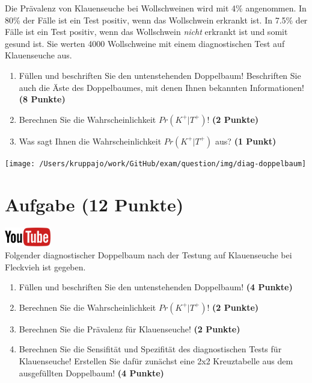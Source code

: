 \documentclass[a4paper, 9pt]{scrartcl}\usepackage[]{graphicx}\usepackage[]{xcolor}
\begin{document}
Die Pr{\"a}valenz von Klauenseuche bei Wollschweinen wird mit
4\% angenommen. In 80\% der F{\"a}lle ist ein Test positiv, wenn das Wollschwein erkrankt
ist. In 7.5\% der F{\"a}lle ist ein Test positiv,
wenn das Wollschwein \textit{nicht} erkrankt ist und somit gesund ist. Sie
werten 4000 Wollschweine mit einem
diagnostischen Test auf Klauenseuche aus.



\begin{enumerate}
\item F{\"u}llen und beschriften Sie den untenstehenden Doppelbaum! Beschriften
  Sie auch die {\"A}ste des Doppelbaumes, mit denen Ihnen bekannten
  Informationen!  \textbf{(8 Punkte)}
\item Berechnen Sie die Wahrscheinlichkeit $Pr(K^+|T^+)$! \textbf{(2 Punkte)}
\item Was sagt Ihnen die Wahrscheinlichkeit $Pr(K^+|T^+)$ aus? \textbf{(1 Punkt)}
\end{enumerate}

\vspace{1cm}

\begin{center}
  \texttt{[image: /Users/kruppajo/work/GitHub/exam/question/img/diag-doppelbaum]}
\end{center}



 
\clearpage

\section{Aufgabe \hfill (12 Punkte)}


\hfill\href{https://youtu.be/_7s44pbOc00}{\includegraphics[width =
  2cm]{img/youtube}}\\[1Ex]





Folgender diagnostischer Doppelbaum nach der Testung auf Klauenseuche bei
Fleckvieh ist gegeben.

\begin{enumerate}
\item F{\"u}llen und beschriften Sie den untenstehenden Doppelbaum! \textbf{(4
    Punkte)}
\item Berechnen Sie die Wahrscheinlichkeit $Pr(K^+|T^+)$! \textbf{(2 Punkte)}
\item Berechnen Sie die Pr{\"a}valenz f{\"u}r Klauenseuche! \textbf{(2 Punkte)}
\item Berechnen Sie die Sensifit{\"a}t und Spezifit{\"a}t des diagnostischen Tests
  f{\"u}r Klauenseuche! Erstellen Sie daf{\"u}r zun{\"a}chst eine 2x2 Kreuztabelle aus
  dem ausgef{\"u}llten Doppelbaum!
  \textbf{(4 Punkte)}
\end{enumerate}
\end{document}
